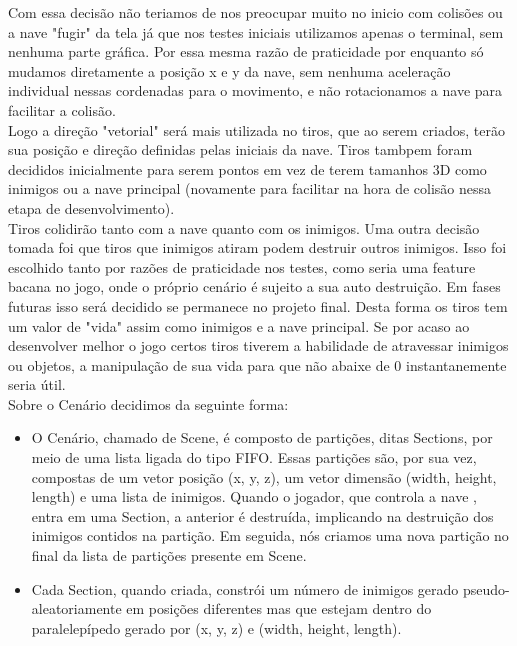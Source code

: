 \documentclass[12pt,a4paper]{article}
\begin{document}
	  	Com essa decisão não teriamos de nos preocupar muito no inicio com colisões ou a nave "fugir"
		da tela já que nos testes iniciais utilizamos apenas o terminal, sem nenhuma parte gráfica. Por
		essa mesma razão de praticidade por enquanto só mudamos diretamente a posição x e y da nave,
		sem nenhuma aceleração individual nessas cordenadas para o movimento, e não rotacionamos a nave
		para facilitar a colisão.\\
		
	  	Logo a direção "vetorial" será mais utilizada no tiros, que ao serem criados, terão sua
		posição e direção definidas pelas iniciais da nave. Tiros tambpem foram decididos inicialmente
		para serem pontos em vez de terem tamanhos 3D como inimigos ou a nave principal (novamente para
		facilitar na hora de colisão nessa etapa de desenvolvimento).\\
		
    		Tiros colidirão tanto com a nave quanto com os inimigos. Uma outra decisão tomada foi que
		tiros que inimigos atiram podem destruir outros inimigos. Isso foi escolhido tanto por razões de
		praticidade nos testes, como seria uma feature bacana no jogo, onde o próprio cenário é sujeito
		a sua auto destruição. Em fases futuras isso será decidido se permanece no projeto final.
    		Desta forma os tiros tem um valor de "vida" assim como inimigos e a nave principal. Se por
		acaso ao desenvolver melhor o jogo certos tiros tiverem a habilidade de atravessar inimigos ou
		objetos, a manipulação de sua vida para que não abaixe de 0 instantanemente seria útil.\\
		
    		Sobre o Cenário decidimos da seguinte forma:
    		\begin{itemize}
    			\item O Cenário, chamado de Scene, é composto de partições, ditas Sections, por meio de uma lista
			ligada do tipo FIFO. Essas partições são, por sua vez, compostas de um vetor posição (x, y, z),
			um vetor dimensão (width, height, length) e uma lista de inimigos. Quando o jogador, que controla
			a nave , entra em uma Section, a anterior é destruída, implicando na destruição dos inimigos
			contidos na partição. Em seguida, nós criamos uma nova partição no final da lista de
			partições presente em Scene.
		
    			\item Cada Section, quando criada, constrói um número de inimigos gerado pseudo-aleatoriamente em
			posições diferentes mas que estejam dentro do paralelepípedo gerado por (x, y, z) e
			(width, height, length).	
    		\end{itemize}
    		
\end{document}
